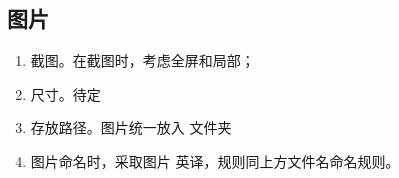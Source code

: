 \documentclass[letterpaper,10pt,english]{sphinxmanual}
\begin{document}
\subsection{图片}
\label{\detokenize{about/style:id4}}\begin{enumerate}
%
\item {} 
\sphinxAtStartPar
截图。在截图时，考虑全屏和局部；

\item {} 
\sphinxAtStartPar
尺寸。待定

\item {} 
\sphinxAtStartPar
存放路径。图片统一放入  文件夹

\item {} 
\sphinxAtStartPar
图片命名时，采取图片  英译，规则同上方文件名命名规则。

\end{enumerate}



\renewcommand{\indexname}{索引}
\printindex
\end{document}
